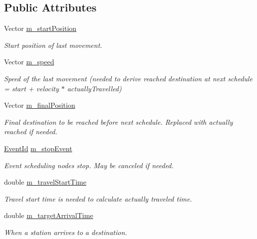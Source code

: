 \subsection*{Public Attributes}
\begin{DoxyCompactItemize}
\item 
Vector \hyperlink{structns3_1_1DestinationPoint_ab0df8a33efe4697241de3071bb74bfaf}{m\+\_\+start\+Position}
\begin{DoxyCompactList}\small\item\em Start position of last movement. \end{DoxyCompactList}\item 
Vector \hyperlink{structns3_1_1DestinationPoint_aa2aea76b64023558167a7d2c09bf618c}{m\+\_\+speed}
\begin{DoxyCompactList}\small\item\em Speed of the last movement (needed to derive reached destination at next schedule = start + velocity $\ast$ actually\+Travelled) \end{DoxyCompactList}\item 
Vector \hyperlink{structns3_1_1DestinationPoint_a57f395e4cb80fbadc07b4526ec7740dd}{m\+\_\+final\+Position}
\begin{DoxyCompactList}\small\item\em Final destination to be reached before next schedule. Replaced with actually reached if needed. \end{DoxyCompactList}\item 
\hyperlink{classns3_1_1EventId}{Event\+Id} \hyperlink{structns3_1_1DestinationPoint_a35b84c102d728c0c950b479cd46cec92}{m\+\_\+stop\+Event}
\begin{DoxyCompactList}\small\item\em Event scheduling node\textquotesingle{}s stop. May be canceled if needed. \end{DoxyCompactList}\item 
double \hyperlink{structns3_1_1DestinationPoint_a27a703034585331d143ab2c5e28f8072}{m\+\_\+travel\+Start\+Time}
\begin{DoxyCompactList}\small\item\em Travel start time is needed to calculate actually traveled time. \end{DoxyCompactList}\item 
double \hyperlink{structns3_1_1DestinationPoint_a62ce9a8957e676a74f878ec180f17d0d}{m\+\_\+target\+Arrival\+Time}
\begin{DoxyCompactList}\small\item\em When a station arrives to a destination. \end{DoxyCompactList}\end{DoxyCompactItemize}


